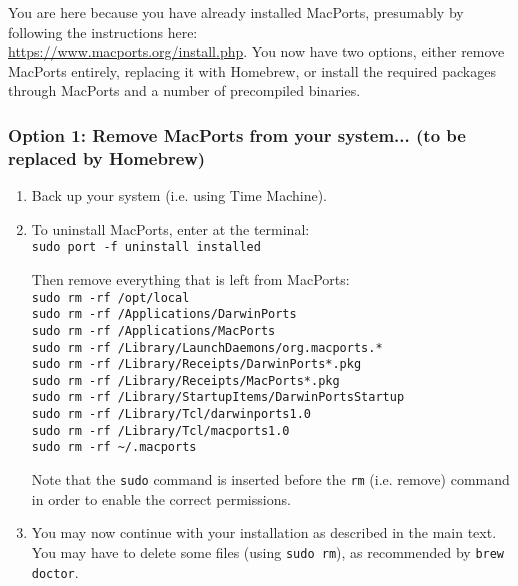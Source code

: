 \documentclass[11pt,fleqn]{book} %
\begin{document}
You are here because you have already installed MacPorts, presumably by following the instructions here:
\\\href{https://www.macports.org/install.php}{https://www.macports.org/install.php}.
You now have two options, either remove MacPorts entirely, replacing it with Homebrew, or install the required packages through MacPorts and a number of precompiled binaries.

\subsubsection*{Option 1: Remove MacPorts from your system... (to be replaced by Homebrew)}

\begin{enumerate}

\item Back up your system (i.e. using Time Machine).

\item To uninstall MacPorts, enter at the terminal:\\
\texttt{sudo port -f uninstall installed}

Then remove everything that is left from MacPorts: \\
\texttt{sudo rm -rf /opt/local} \\
\texttt{sudo rm -rf /Applications/DarwinPorts} \\
\texttt{sudo rm -rf /Applications/MacPorts} \\
\texttt{sudo rm -rf /Library/LaunchDaemons/org.macports.*} \\
\texttt{sudo rm -rf /Library/Receipts/DarwinPorts*.pkg}\\
\texttt{sudo rm -rf /Library/Receipts/MacPorts*.pkg} \\
\texttt{sudo rm -rf /Library/StartupItems/DarwinPortsStartup} \\
\texttt{sudo rm -rf /Library/Tcl/darwinports1.0} \\
\texttt{sudo rm -rf /Library/Tcl/macports1.0} \\
\texttt{sudo rm -rf \textasciitilde/.macports}

Note that the \texttt{sudo} command is inserted before the \texttt{rm} (i.e. remove) command in order to enable the correct permissions.

\item You may now continue with your installation as described in the main text. You may have to delete some files (using \texttt{sudo rm}), as recommended by \texttt{brew doctor}.

\end{enumerate}
\end{document}
